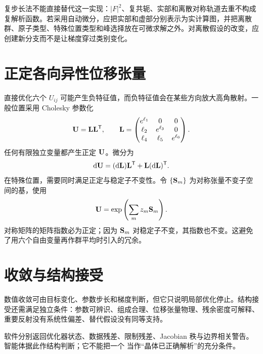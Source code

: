 复步长法不能直接替代这一实现：$|F|^2$、复共轭、实部和离散对称轨道去重不构成复解析函数。若采用自动微分，应把实部和虚部分别表示为实计算图，并把离散群、原子类型、特殊位置类型和峰选择放在可微求解之外。对离散假设的改变，应创建新分支而不是让梯度穿过类别变化。

\section{正定各向异性位移张量}
直接优化六个 $U_{ij}$ 可能产生负特征值，而负特征值会在某些方向放大高角散射。一般位置采用 Cholesky 参数化
\begin{equation}
\mathbf{U}=\mathbf{L}\mathbf{L}^{\mathsf T},\qquad
\mathbf{L}=\begin{pmatrix}
e^{\ell_1}&0&0\\
\ell_2&e^{\ell_3}&0\\
\ell_4&\ell_5&e^{\ell_6}
\end{pmatrix}.
\end{equation}
任何有限独立变量都产生正定 $\mathbf{U}$。微分为
\begin{equation}
\mathrm{d}\mathbf{U}=(\mathrm{d}\mathbf{L})\mathbf{L}^{\mathsf T}+\mathbf{L}(\mathrm{d}\mathbf{L})^{\mathsf T}.
\end{equation}
在特殊位置，需要同时满足正定与稳定子不变性。令 $\{\mathbf{S}_m\}$ 为对称张量不变子空间的基，使用
\begin{equation}
\mathbf{U}=\exp\left(\sum_m z_m\mathbf{S}_m\right).
\end{equation}
对称矩阵的矩阵指数必为正定；因为 $\mathbf{S}_m$ 对稳定子不变，其指数也不变。这避免了用六个自由变量再作群平均时引入的冗余。

\section{收敛与结构接受}
数值收敛可由目标变化、参数步长和梯度判断，但它只说明局部优化停止。结构接受还需满足独立条件：参数可辨识、组成合理、位移张量物理、残余密度可解释、重要反射没有系统性偏差、替代假设没有同等支持。

软件分别返回优化器状态、数据残差、限制残差、Jacobian 秩与边界相关警告。智能体据此作结构判断；它不能把一个  当作“晶体已正确解析”的充分条件。

